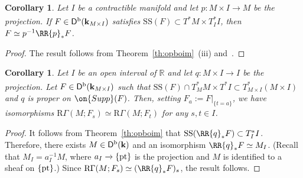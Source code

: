 \documentclass[12pt,leqno]{article}
\newtheorem{corollary}[theorem]{Corollary}
\theoremstyle{definition}
\newcommand{\R}{{\mathbb{R}}}
\newcommand{\cor}{{\bf k}}
\newcommand{\rmptt}{{\{\rm pt\}}}
\renewcommand{\to}[1][]{\xrightarrow[]{#1}}
\newcommand{\rsect}{\mathrm{R}\Gamma}
\newcommand{\roim}[1]{\RR{#1}_*}
\newcommand{\opb}[1]{#1^{-1}}
\newcommand{\eqdot}{\mathbin{:=}}
\newcommand{\cl}{\colon}
\newcommand{\Supp}{\on{Supp}}
\newcommand{\Der}[1][]{\mathsf{D}^{#1}}
\newcommand{\Derb}{\Der[\mathrm{b}]}
\newcommand{\SSi}{\mathrm{SS}}
\numberwithin{equation}{section}
\begin{document}
\begin{corollary}\label{cor:opbeqv}
Let $I$ be a contractible manifold and let $p\cl M\times I\to M$ be the projection.
If $F\in\Derb(\cor_{M\times I})$ satisfies  $\SSi(F)\subset T^*M\times T^*_II$,
then $F\simeq\opb{p}\roim{p}F$.
\end{corollary}
\begin{proof}
The result follows
from Theorem~\ref{th:opboim}~(iii) and~\cite[Prop.~2.7.8]{KS90}.
\end{proof}


\begin{corollary}\label{cor:rsectFt}
Let $I$ be an open interval of $\R$ and let $q\cl M\times I\to I$ be the projection.
Let $F\in\Derb(\cor_{M\times I})$ such that 
$\SSi(F)\cap T^*_MM\times T^*I\subset T^*_{M\times I}(M\times I)$ and 
$q$ is proper on $\Supp(F)$. Then, setting $F_a\eqdot F\vert_{\{t=a\}}$,
we have isomorphisms 
$\rsect(M; F_s) \simeq \rsect(M; F_t)$ for any $s,t\in I$.
\end{corollary}
\begin{proof}
It follows from Theorem~\ref{th:opboim} that
$\SSi(\roim{q}F)\subset T^*_II$. Therefore, there exists $M\in\Derb(\cor)$
and an isomorphism $\roim{q}F\simeq M_I$. (Recall that
$M_I=\opb{a_I}M$,
where $a_I\to\rmptt$ is the projection and $M$ is identified to a sheaf
on $\rmptt$.) 
Since $\rsect(M; F_s) \simeq (\roim{q} F)_s$, the result follows.
\end{proof}
\end{document}
